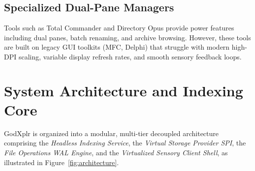 \documentclass[conference]{IEEEtran}
\begin{document}
\subsection{Specialized Dual-Pane Managers}
Tools such as Total Commander and Directory Opus provide power features including dual panes, batch renaming, and archive browsing. However, these tools are built on legacy GUI toolkits (MFC, Delphi) that struggle with modern high-DPI scaling, variable display refresh rates, and smooth sensory feedback loops.

\section{System Architecture and Indexing Core}

GodXplr is organized into a modular, multi-tier decoupled architecture comprising the \textit{Headless Indexing Service}, the \textit{Virtual Storage Provider SPI}, the \textit{File Operations WAL Engine}, and the \textit{Virtualized Sensory Client Shell}, as illustrated in Figure~\ref{fig:architecture}.
\end{document}
